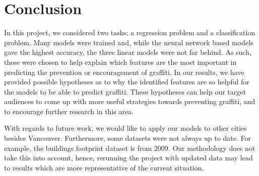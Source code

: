 \chapter{Conclusion}

In this project, we considered two tasks: a regression problem and a classification problem. Many models were trained and, while the neural network based models gave the highest accuracy, the three linear models were not far behind. As such, these were chosen to help explain which features are the most important in predicting the prevention or encouragement of graffiti. In our results, we have provided possible hypotheses as to why the identified features are so helpful for the models to be able to predict graffiti. These hypotheses can help our target audiences to come up with more useful strategies towards preventing graffiti, and to encourage further research in this area.

With regards to future work, we would like to apply our models to other cities besides Vancouver. Furthermore, some datasets were not always up to date. For example, the buildings footprint dataset is from 2009. Our methodology does not take this into account, hence, rerunning the project with updated data may lead to results which are more representative of the current situation.
